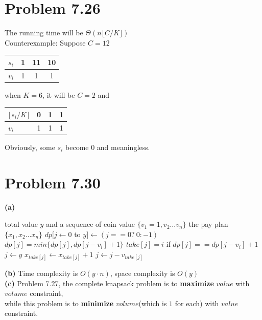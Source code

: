 \documentclass[a4paper]{article}
\begin{document}
\begin{spacing}{1.3}
\section*{Problem 7.26}
\begin{multicols}{2}
The running time will be $\Theta(n\lfloor C/K\rfloor)$
\\Counterexample: Suppose $C=12$
\begin{table}[H]
\centering  
\begin{tabular}{lccc}
\hline
$s_i$  &1 &11 &10\\ \hline  
$v_i$ &1 &1 &1\\ \hline
\end{tabular}
\end{table}
when $K=6$, it will be $C=2$ and
\begin{table}[H]
\centering  
\begin{tabular}{lccc}
\hline
$\lfloor s_i/K\rfloor$  &0 &1 &1\\ \hline  
$v_i$ &1 &1 &1\\ \hline
\end{tabular}
\end{table} 
Obviously, some $s_i$ become $0$ and meaningless.
\end{multicols}

\section*{Problem 7.30}
\textbf{(a)}
\begin{algorithmic}[1]
\Require total value $y$ and a sequence of coin value $\{ v_1=1,v_2\ldots v_n\}$
\Ensure the pay plan $\{x_1,x_2\ldots x_n\}$
\State $dp[j\gets 0$ to $y ]\gets (j==0?\ 0:-1)$
\State $dp[j]=min\{dp[j],dp[j-v_i]+1\}$
\State $take[j]=i$ if $dp[j]==dp[j-v_i]+1$
\EndFor
\EndFor
\State $j\gets y$
\State $x_{take[j]}\gets x_{take[j]}+1$
\State $j\gets j-v_{take[j]}$
\EndWhile
\end{algorithmic}
\textbf{(b)} Time complexity is $O(y\cdot n)$, space complexity is $O(y)$
\\\textbf{(c)}
Problem 7.27, the complete knapsack problem is to \textbf{maximize} $value$ with $volume$ constraint, 
\\while this problem is to \textbf{minimize} $volume$(which is $1$ for each) with $value$ constraint.


\end{spacing}
\end{document}
